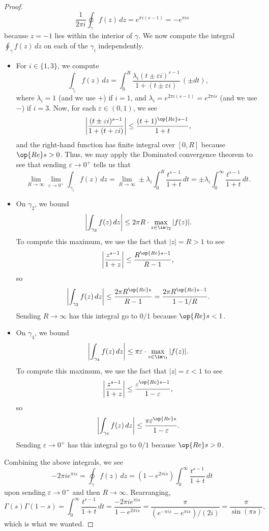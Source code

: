 \documentclass[../notes.tex]{subfiles}
\begin{document}
\begin{proof}
	\[\frac1{2\pi i}\oint_\gamma f(z)\,dz=e^{\pi i(s-1)}=-e^{\pi is}\]
	because $z=-1$ lies within the interior of $\gamma$. We now compute the integral $\oint_\gamma f(z)\,dz$ on each of the $\gamma_i$ independently.
	\begin{itemize}
		\item For $i\in\{1,3\}$, we compute
		\[\int_{\gamma_i}f(z)\,dz=\int_0^R\frac{\lambda_i(t\pm\varepsilon i)^{s-1}}{1+(t\pm\varepsilon i)}\,(\pm dt),\]
		where $\lambda_i=1$ (and we use $+$) if $i=1$, and $\lambda_i=e^{2\pi i(s-1)}=e^{2\pi is}$ (and we use $-$) if $i=3$. Now, for each $\varepsilon\in(0,1)$, we see
		\[\left|\frac{(t\pm\varepsilon i)^{s-1}}{1+(t+\varepsilon i)}\right|\le\frac{(t+1)^{\op{Re}s-1}}{1+t},\]
		and the right-hand function has finite integral over $[0,R]$ because $\op{Re}s>0$. Thus, we may apply the Dominated convergence theorem to see that sending $\varepsilon\to0^+$ tells us that
		\[\lim_{R\to\infty}\lim_{\varepsilon\to0^+}\int_{\gamma_i}f(z)\,dz=\lim_{R\to\infty}\pm\lambda_i\int_0^R\frac{t^{s-1}}{1+t}\,dt=\pm\lambda_i\int_0^\infty\frac{t^{s-1}}{1+t}\,dt.\]
		\item On $\gamma_2$, we bound
		\[\left|\int_{\gamma_2}f(z)\,dz\right|\le2\pi R\cdot\max_{z\in\im\gamma_2}|f(z)|.\]
		To compute this maximum, we use the fact that $|z|=R>1$ to see
		\[\left|\frac{z^{s-1}}{1+z}\right|\le\frac{R^{\op{Re}s-1}}{R-1},\]
		so
		\[\left|\int_{\gamma_2}f(z)\,dz\right|\le\frac{2\pi R^{\op{Re}s}}{R-1}=\frac{2\pi R^{\op{Re}s-1}}{1-1/R}.\]
		Sending $R\to\infty$ has this integral go to $0/1$ because $\op{Re}s<1$.
		\item On $\gamma_4$, we bound
		\[\left|\int_{\gamma_4}f(z)\,dz\right|\le\pi\varepsilon\cdot\max_{z\in\im\gamma_t}|f(z)|.\]
		To compute this maximum, we use the fact that $|z|=\varepsilon<1$ to see
		\[\left|\frac{z^{s-1}}{1+z}\right|\le\frac{\varepsilon^{\op{Re}s-1}}{1-\varepsilon},\]
		so
		\[\left|\int_{\gamma_4}f(z)\,dz\right|\le\frac{\pi\varepsilon^{\op{Re}s}}{1-\varepsilon}.\]
		Sending $\varepsilon\to0^+$ has this integral go to $0/1$ because $\op{Re}s>0$.
	\end{itemize}
	Combining the above integrals, we see
	\[-2\pi ie^{\pi is}=\oint_\gamma f(z)\,dz=\left(1-e^{2\pi is}\right)\int_0^\infty\frac{t^{s-1}}{1+t}\,dt\]
	upon sending $\varepsilon\to0^+$ and then $R\to\infty$. Rearranging,
	\[\Gamma(s)\Gamma(1-s)=\int_0^\infty\frac{t^{s-1}}{1+t}\,dt=\frac{-2\pi ie^{\pi is}}{1-e^{2\pi is}}=\frac\pi{\left(e^{-\pi is}-e^{\pi is}\right)/(2i)}=\frac\pi{\sin(\pi s)},\]
	which is what we wanted.
\end{proof}
\end{document}
